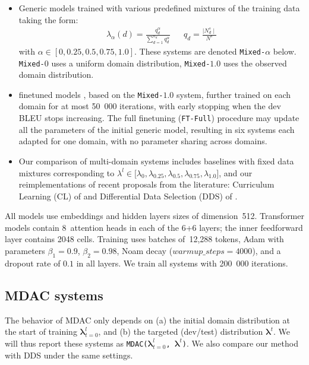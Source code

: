 \documentclass[11pt]{article}
\newcommand{\fyTodo}[1]{\Todo[FY:]{\textcolor{orange}{#1}}}
\newcommand{\system}[1]{\texttt{{#1}}}
\newcommand{\vlambda}{\ensuremath{\boldsymbol\lambda}\xspace} %
\begin{document}
\begin{itemize}
\itemsep0em 
\item Generic models trained with various predefined mixtures of the training data taking the form:
\begin{align} \label{mixture:trn}
\lambda_{\alpha}(d) = \frac{q_d^{\alpha}}{\displaystyle{\mathop{\sum}_{d=1}^{n_d}q_d^{\alpha}}} &&
q_d = \frac{\mid N^{s}_d \mid}{\displaystyle{N^{s}}} %
\end{align} \setlength{\abovedisplayskip}{2pt}
\setlength{\belowdisplayskip}{2pt} 
with $\alpha \in [0,0.25,0.5,0.75,1.0]$. These systems are denoted \system{Mixed-$\alpha$} below. \system{Mixed-$0$} uses a uniform domain distribution, \system{Mixed-$1.0$} uses the observed domain distribution.
\item finetuned models \citep{Luong15stanford,Freitag16fast}, based on the \system{Mixed-$1.0$} system, further trained on each domain for at most 50~000 iterations, with early stopping when the dev BLEU stops increasing.\fyTodo{for ?? iterations} The full finetuning (\system{FT-Full}) procedure may update all the parameters of the initial generic model, resulting in six systems each adapted for one domain, with no parameter sharing across domains.
 
\item Our comparison of multi-domain systems\fyTodo{CL is only dynamic ?} includes baselines with fixed data mixtures corresponding to $\lambda^l \in \big[ \lambda_0, \lambda_{0.25}, \lambda_{0.5}, \lambda_{0.75}, \lambda_{1.0}\big]$, and our reimplementations of recent proposals from the literature: Curriculum Learning (CL) of \citet{Zhang19curriculum} and Differential Data Selection (DDS) of \citet{Wang20balancing}.
\end{itemize}

All models use embeddings and hidden layers sizes of dimension~512. Transformer models contain 8~attention heads in each of the 6+6 layers; the inner feedforward layer contains 2048 cells. Training uses batches of~12,288 tokens, Adam with parameters $\beta_1=0.9$, $\beta_2= 0.98$, Noam decay ($warmup\_steps=4000$), and a dropout rate of $0.1$ in all layers. We train all systems with 200~000 iterations.

\subsection{MDAC systems} \label{ssec:dds-sys}
The behavior of MDAC only depends on (a) the initial domain distribution at the start of training $\vlambda^{l}_{t=0}$, and (b) the targeted (dev/test) distribution $\vlambda^{t}$. We will thus report these systems as \system{MDAC($\vlambda^{l}_{t=0}$, $\vlambda^{t}$)}. We also compare our method with DDS under the same settings.
\end{document}
